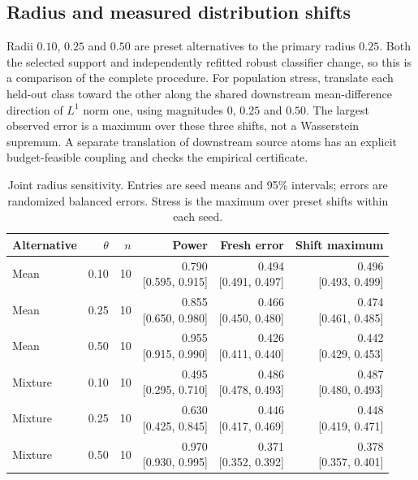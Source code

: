 \documentclass[11pt,a4paper]{article}
\begin{document}
\subsection{Radius and measured distribution shifts}
Radii $0.10$, $0.25$ and $0.50$ are preset alternatives to the primary radius
$0.25$. Both the selected support and independently refitted robust classifier
change, so this is a comparison of the complete procedure.
For population stress, translate each held-out class toward the other along the
shared downstream mean-difference direction of $L^1$ norm one, using magnitudes
$0$, $0.25$ and $0.50$. The largest observed error is a maximum over these three
shifts, not a Wasserstein supremum. A separate translation of downstream source
atoms has an explicit budget-feasible coupling and checks the empirical certificate.
\begin{table}[tbp]\centering\small\setlength{\tabcolsep}{3.5pt}
\caption{Joint radius sensitivity. Entries are seed means and 95\% intervals; errors are randomized balanced errors. Stress is the maximum over preset shifts within each seed.}\label{tab:radius}
\begin{tabularx}{\linewidth}{@{}p{22mm}rrrrr@{}}
\toprule Alternative & $\theta$ & $n$ & Power & Fresh error & Shift maximum \\
\midrule
Mean & 0.10 & 10 & \shortstack{0.790\\{[0.595, 0.915]}} & \shortstack{0.494\\{[0.491, 0.497]}} & \shortstack{0.496\\{[0.493, 0.499]}} \\
Mean & 0.25 & 10 & \shortstack{0.855\\{[0.650, 0.980]}} & \shortstack{0.466\\{[0.450, 0.480]}} & \shortstack{0.474\\{[0.461, 0.485]}} \\
Mean & 0.50 & 10 & \shortstack{0.955\\{[0.915, 0.990]}} & \shortstack{0.426\\{[0.411, 0.440]}} & \shortstack{0.442\\{[0.429, 0.453]}} \\
Mixture & 0.10 & 10 & \shortstack{0.495\\{[0.295, 0.710]}} & \shortstack{0.486\\{[0.478, 0.493]}} & \shortstack{0.487\\{[0.480, 0.493]}} \\
Mixture & 0.25 & 10 & \shortstack{0.630\\{[0.425, 0.845]}} & \shortstack{0.446\\{[0.417, 0.469]}} & \shortstack{0.448\\{[0.419, 0.471]}} \\
Mixture & 0.50 & 10 & \shortstack{0.970\\{[0.930, 0.995]}} & \shortstack{0.371\\{[0.352, 0.392]}} & \shortstack{0.378\\{[0.357, 0.401]}} \\
\bottomrule\end{tabularx}\end{table}
\end{document}
